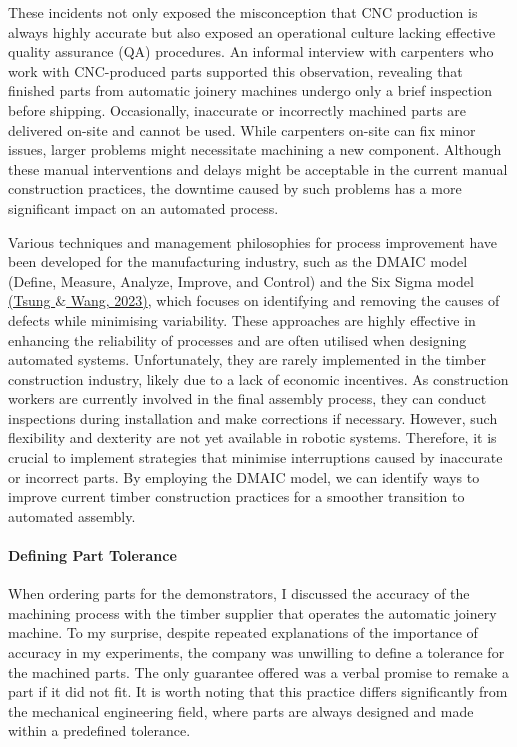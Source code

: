 \documentclass[11pt]{book}
\begin{document}
These incidents not only exposed the misconception that CNC production is always highly accurate but also exposed an operational culture lacking effective quality assurance (QA) procedures. An informal interview with carpenters who work with CNC-produced parts supported this observation, revealing that finished parts from automatic joinery machines undergo only a brief inspection before shipping. Occasionally, inaccurate or incorrectly machined parts are delivered on-site and cannot be used. While carpenters on-site can fix minor issues, larger problems might necessitate machining a new component. Although these manual interventions and delays might be acceptable in the current manual construction practices, the downtime caused by such problems has a more significant impact on an automated process.

Various techniques and management philosophies for process improvement have been developed for the manufacturing industry, such as the DMAIC model (Define, Measure, Analyze, Improve, and Control) and the Six Sigma model \href{https://www.zotero.org/google-docs/?RYtRe9}{(Tsung $\&$ Wang, 2023)}, which focuses on identifying and removing the causes of defects while minimising variability. These approaches are highly effective in enhancing the reliability of processes and are often utilised when designing automated systems. Unfortunately, they are rarely implemented in the timber construction industry, likely due to a lack of economic incentives. As construction workers are currently involved in the final assembly process, they can conduct inspections during installation and make corrections if necessary. However, such flexibility and dexterity are not yet available in robotic systems. Therefore, it is crucial to implement strategies that minimise interruptions caused by inaccurate or incorrect parts. By employing the DMAIC model, we can identify ways to improve current timber construction practices for a smoother transition to automated assembly.

\paragraph{Defining Part Tolerance}

When ordering parts for the demonstrators, I discussed the accuracy of the machining process with the timber supplier that operates the automatic joinery machine. To my surprise, despite repeated explanations of the importance of accuracy in my experiments, the company was unwilling to define a tolerance for the machined parts. The only guarantee offered was a verbal promise to remake a part if it did not fit. It is worth noting that this practice differs significantly from the mechanical engineering field, where parts are always designed and made within a predefined tolerance. 
\end{document}
